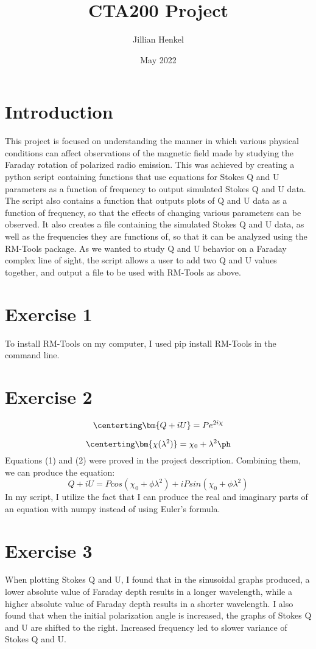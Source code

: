\documentclass{article}
\title{ CTA200 Project}
\author{Jillian Henkel}
\date{May 2022}
\begin{document}
\maketitle

\section*{Introduction}
This project is focused on understanding the manner in which various physical conditions can affect observations of the magnetic field made by studying the Faraday rotation of polarized radio emission. This was achieved by creating a python script containing functions that use equations for Stokes Q and U parameters as a function of frequency to output simulated Stokes Q and U data. The script also contains a function that outputs plots of Q and U data as a function of frequency, so that the effects of changing various parameters can be observed. It also creates a file containing the simulated Stokes Q and U data, as well as the frequencies they are functions of, so that it can be analyzed using the RM-Tools package. As we wanted to study Q and U behavior on a Faraday complex line of sight, the script allows a user to add two Q and U values together, and output a file to be used with RM-Tools as above.
\section*{Exercise 1}
To install RM-Tools on my computer, I used pip install RM-Tools in the command line.
\section*{Exercise 2}

\begin{equation}
  \centerting
    \label{eq:1}
    \bm{Q+iU}  = {Pe^{2i\chi}} 
\end{equation}

\begin{equation}
  \centerting
    \label{eq:2}
    \bm{\chi(\lambda^{2})}  = \chi_{0} +\lambda^{2} \ph
\end{equation}
Equations (1) and (2) were proved in the project description. Combining them, we can produce the equation:
$$Q+iU = Pcos(\chi_{0}+\phi \lambda^{2}) + iPsin(\chi_{0}+\phi \lambda^{2})$$
In my script, I utilize the fact that I can produce the real and imaginary parts of an equation with numpy instead of using Euler's formula.
\section*{Exercise 3}
When plotting Stokes Q and U, I found that in the sinusoidal graphs produced, a lower absolute value of Faraday depth results in a longer wavelength, while a higher absolute value of Faraday depth results in a shorter wavelength. I also found that when the initial polarization angle is increased, the graphs of Stokes Q and U are shifted to the right. Increased frequency led to slower variance of Stokes Q and U.
\end{document}
